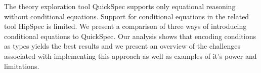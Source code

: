 The theory exploration tool QuickSpec
supports only equational reasoning without
conditional equations. Support for conditional
equations in the related tool HipSpec is limited.
We present a comparison of three ways of introducing
conditional equations to QuickSpec.
Our analysis shows that encoding conditions as types
yields the best results and we present an overview of
the challenges associated with implementing
this approach as well as examples
of it's power and limitations.
